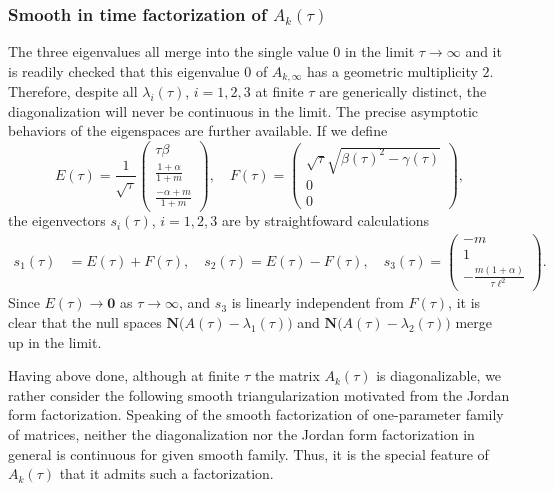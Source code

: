 \documentclass[a4paper,11pt]{article}
\def\l{{\ell}}
\theoremstyle{remark}
\begin{document}
\subsubsection{Smooth in time factorization of $A_k(\tau)$}
The three eigenvalues all merge into the single value $0$ in the limit $\tau \rightarrow \infty$ and it is readily checked that this eigenvalue $0$ of $A_{k,\infty}$ has a geometric multiplicity $2$. Therefore, despite all $\lambda_i(\tau)$, $i=1,2,3$ at finite $\tau$ are generically distinct, the diagonalization will never be continuous in the limit.
The precise asymptotic behaviors of the eigenspaces are further available. %
If we define
$$ E(\tau) = \frac{1}{\sqrt{\tau}} \begin{pmatrix} \tau\beta \\ \frac{1+\alpha}{1+m} \\ \frac{-\alpha+m}{1+m} \end{pmatrix}, \quad  F(\tau)= \begin{pmatrix}  \sqrt{\tau}\sqrt{\beta(\tau)^2-\gamma(\tau)}\\0\\0 \end{pmatrix},$$
the eigenvectors $s_i(\tau)$, $i=1,2,3$ are by straightfoward calculations
\begin{align*}
 s_1(\tau)&=E(\tau) + F(\tau), \quad s_2(\tau)=E(\tau)-F(\tau), \quad s_3(\tau) = \begin{pmatrix} -m\\1\\ -\frac{m(1+\alpha)}{\tau\l^2} \end{pmatrix}.
\end{align*}
Since $E(\tau) \rightarrow \mathbf{0}$ as $\tau \rightarrow \infty$, and $s_3$ is linearly independent from $F(\tau)$, it is clear that the null spaces $\mathbf{N}\Big(A(\tau) - \lambda_1(\tau)\Big)$ and $\mathbf{N}\Big(A(\tau) - \lambda_2(\tau)\Big)$ merge up in the limit.


Having above done, although at finite $\tau$ the matrix $A_k(\tau)$ is diagonalizable, we rather consider the following smooth triangularization motivated from the Jordan form factorization. Speaking of the smooth factorization of one-parameter family of matrices, neither the diagonalization nor the Jordan form factorization in general is continuous for given smooth family. Thus, it is the special feature of $A_k(\tau)$ that it admits such a factorization.
\end{document}
